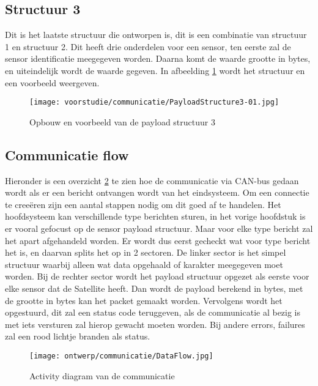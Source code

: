 \subsection{Structuur 3}
Dit is het laatste structuur die ontworpen is, dit is een combinatie van structuur 1 en structuur 2. Dit heeft drie onderdelen voor een sensor, ten eerste zal de sensor identificatie meegegeven worden. Daarna komt de waarde grootte in bytes, en uiteindelijk wordt de waarde gegeven. In afbeelding \ref{fig:Structure3} wordt het structuur en een voorbeeld weergeven.
\begin{figure}[h!]
	\label{fig:Structure3}

	\texttt{[image: voorstudie/communicatie/PayloadStructure3-01.jpg]}
	\caption{Opbouw en voorbeeld van de payload structuur 3}
\end{figure}

\newpage
\subsection{Communicatie flow}
Hieronder is een overzicht \ref{fig:comflow} te zien hoe de communicatie via CAN-bus gedaan wordt als er een bericht ontvangen wordt van het eindsysteem. Om een connectie te creeëren zijn een aantal stappen nodig om dit goed af te handelen. Het hoofdsysteem kan verschillende type berichten sturen, in het vorige hoofdstuk is er vooral gefocust op de sensor payload structuur. Maar voor elke type bericht zal het apart afgehandeld worden. Er wordt dus eerst gecheckt wat voor type bericht het is, en daarvan splits het op in 2 sectoren. De linker sector is het simpel structuur waarbij alleen wat data opgehaald of karakter meegegeven moet worden. Bij de rechter sector wordt het payload structuur opgezet als eerste voor elke sensor dat de Satellite heeft. Dan wordt de payload berekend in bytes, met de grootte in bytes kan het packet gemaakt worden. Vervolgens wordt het opgestuurd, dit zal een status code teruggeven, als de communicatie al bezig is met iets versturen zal hierop gewacht moeten worden. Bij andere errors, failures zal een rood lichtje branden als status.
\begin{figure}[h!]
	\centering
	\label{fig:comflow}

	\texttt{[image: ontwerp/communicatie/DataFlow.jpg]}
	\caption{Activity diagram van de communicatie}
\end{figure}

\newpage
